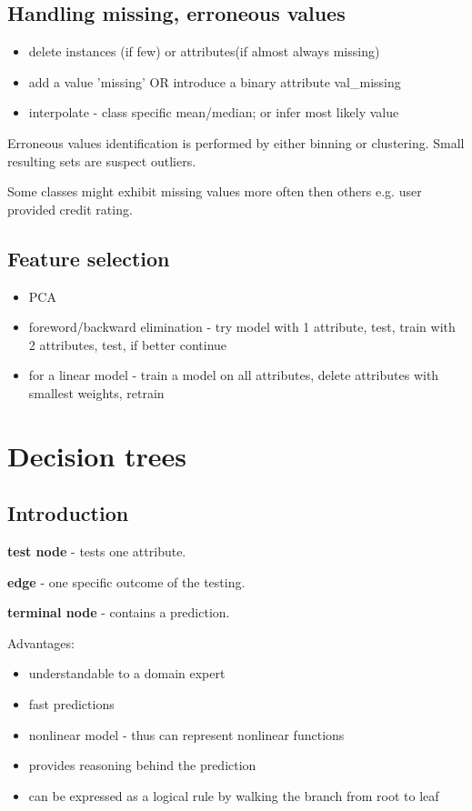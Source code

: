 \documentclass{article}
\newcommand{\para}[0]{\par\vspace{0.2cm}\noindent}
\newcommand{\define}[2]{\textbf{#1} - {#2}.  \para}
\begin{document}
\subsection{Handling missing, erroneous values}
\begin{itemize}
    \item{delete instances (if few) or attributes(if almost always missing)}
    \item{add a value 'missing' OR introduce a binary attribute val\_missing}
    \item{interpolate - class specific mean/median; or infer most likely value}
\end{itemize}
\para
Erroneous values identification is performed by either binning or clustering.
Small resulting sets are suspect outliers.
\par
Some classes might exhibit missing values more often then others e.g. user provided credit rating.


\subsection{Feature selection}
\begin{itemize}
    \item{PCA}
    \item{foreword/backward elimination - try model with 1 attribute, test, train with 2 attributes, test, if better continue}
    \item{for a linear model - train a model on all attributes, delete attributes with smallest weights, retrain}
\end{itemize}


\section{Decision trees}
\subsection{Introduction}
\define{test node}
           {tests one attribute}
\define{edge}
           {one specific outcome of the testing}
\define{terminal node}
           {contains a prediction}

Advantages:
\begin{itemize}
    \item{understandable to a domain expert}
    \item{fast predictions}
    \item{nonlinear model - thus can represent nonlinear functions}
    \item{provides reasoning behind the prediction}
    \item{can be expressed as a logical rule by walking the branch from root to leaf}
\end{itemize}
\end{document}
